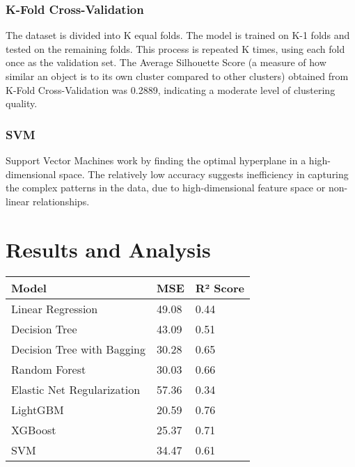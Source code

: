 \documentclass[10pt,twocolumn,letterpaper]{article}
\begin{document}
        \subsubsection{K-Fold Cross-Validation}
            The dataset is divided into K equal folds. The model is trained on K-1 folds and tested on the remaining folds. This process is repeated K times, using each fold once as the validation set. The Average Silhouette Score (a measure of how similar an object is to its own cluster compared to other clusters) obtained from K-Fold Cross-Validation was 0.2889, indicating a moderate level of clustering quality.

        \subsubsection{SVM}
            Support Vector Machines work by finding the optimal hyperplane in a high-dimensional space. The relatively low accuracy suggests inefficiency in capturing the complex patterns in the data, due to high-dimensional feature space or non-linear relationships.

\section{Results and Analysis}

    \begin{table}[h!]
        \centering
        \begin{tabular}{|l|l|l|}
            \hline
            \textbf{Model} & \textbf{MSE} & \textbf{R² Score} \\ \hline
            Linear Regression              & 49.08     & 0.44      \\ \hline
            Decision Tree                  & 43.09     & 0.51      \\ \hline
            Decision Tree with Bagging     & 30.28     & 0.65     \\ \hline
            Random Forest                  & 30.03     & 0.66      \\ \hline
            Elastic Net Regularization     & 57.36     & 0.34      \\ \hline
            LightGBM                      & 20.59    & 0.76     \\ \hline
            XGBoost                       & 25.37     & 0.71      \\ \hline
            SVM                       & 34.47     & 0.61      \\ \hline
        \end{tabular}
        \label{tab:model_metrics}
    \end{table}
\end{document}
